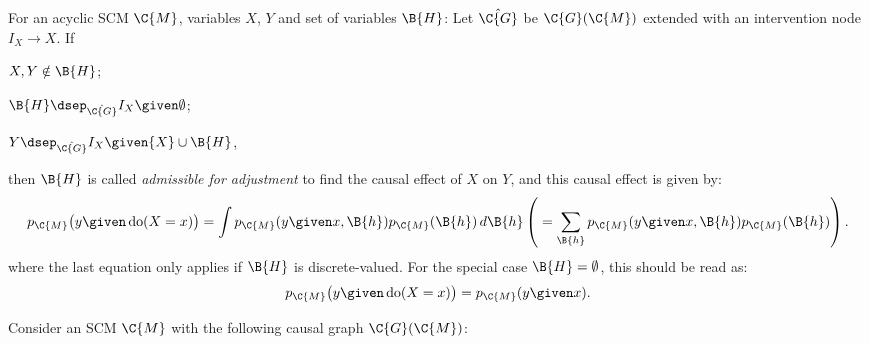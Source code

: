\documentclass{article}
\DeclareMathOperator{\intervene}{do}
\begin{document}
\begin{theorem}
  For an acyclic SCM $\C{M}$, variables $X$, $Y$ and set of variables $\B{H}$: 
  Let $\hat{\C{G}}$ be $\C{G}(\C{M})$ extended with an intervention node $I_X \to X$. If
  \begin{compactenum}
  \item $X, Y \notin \B{H}$;
  \item $\B{H} \dsep_{\hat{\C{G}}} I_X \given \emptyset$;
  \item $Y \dsep_{\hat{\C{G}}} I_X \given \{X\} \cup \B{H}$,
  \end{compactenum}
  then $\B{H}$ is called \emph{admissible for adjustment} to find the causal effect of $X$ on $Y$, and this causal effect is given by:
    $$p_{\C{M}}\big(y \given \intervene(X=x)\big) = \int p_{\C{M}}(y \given x, \B{h}) p_{\C{M}}(\B{h}) \,d\B{h} \left( {} = \sum_{\B{h}} p_{\C{M}}(y \given x, \B{h}) p_{\C{M}}(\B{h})\right).$$
  where the last equation only applies if $\B{H}$ is discrete-valued.
  For the special case $\B{H} = \emptyset$, this should be read as:
  $$p_{\C{M}}\big(y \given \intervene(X=x)\big) = p_{\C{M}}(y \given x).$$
\end{theorem}

  Consider an SCM $\C{M}$ with the following causal graph $\C{G}(\C{M})$:\\
  \begin{center}\end{center}
\end{document}
